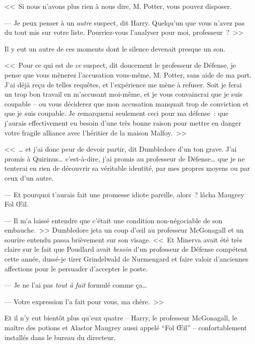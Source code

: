 <<~Si nous n'avons plus rien à nous dire, M. Potter, vous pouvez disposer.

--- Je peux penser à un \emph{autre} suspect, dit Harry. Quelqu'un que vous n'avez pas du tout mis sur votre liste. Pourriez-vous l'analyser pour moi, professeur~?~>>

Il y eut un autre de ces moments dont le silence devenait presque un son.

<<~Pour ce qui est de \emph{ce} suspect, dit doucement le professeur de Défense, je pense que vous mènerez l'accusation vous-même, M. Potter, sans aide de ma part. J'ai déjà reçu de telles requêtes, et l'expérience me mène à refuser. Soit je ferai un trop bon travail en m'accusant moi-même, et je vous convaincrai que je suis coupable -- ou vous déciderez que mon accusation manquait trop de conviction et que je suis coupable. Je remarquerai seulement ceci pour ma défense~: que j'aurais effectivement eu besoin d'une très bonne raison pour mettre en danger votre fragile alliance avec l'héritier de la maison Malfoy.~>>


<<~… et j'ai donc peur de devoir partir, dit Dumbledore d'un ton grave. J'ai promis à Quirinus… c'est-à-dire, j'ai promis au professeur de Défense… que je ne tenterai en rien de découvrir sa véritable identité, par mes propres moyens ou par ceux d'un autre.

--- Et pourquoi t'aurais fait une promesse idiote pareille, alors~? lâcha Maugrey Fol Œil.

--- Il m'a laissé entendre que c'était une condition non-négociable de son embauche.~>> Dumbledore jeta un coup d'œil au professeur McGonagall et un sourire entendu passa brièvement sur son visage. <<~Et Minerva avait été très claire sur le fait que Poudlard avait \emph{besoin} d'un professeur de Défense compétent cette année, dussé-je tirer Grindelwald de Nurmengard et faire valoir d'anciennes affections pour le persuader d'accepter le poste.

--- Je ne l'ai pas \emph{tout à fait} formulé comme ça…

--- Votre expression l'a fait pour vous, ma chère.~>>

Et il n'y eut bientôt plus qu'eux quatre -- Harry, le professeur McGonagall, le maître des potions et Alastor Maugrey aussi appelé “Fol Œil” -- confortablement installés dans le bureau du directeur.

